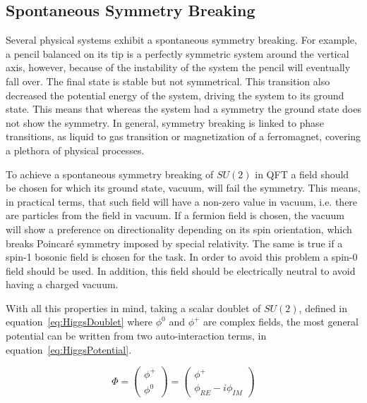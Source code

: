 \subsection{Spontaneous Symmetry Breaking}
\label{sec:SSB}

Several physical systems exhibit a spontaneous symmetry breaking. For example, a pencil balanced on its tip is a perfectly symmetric system around the vertical axis, however, because of the instability of the system the pencil will eventually fall over. The final state is stable but not symmetrical. This transition also decreased the potential energy of the system, driving the system to its ground state. This means that whereas the system had a symmetry the ground state does not show the symmetry. In general, symmetry breaking is linked to phase transitions, as liquid to gas transition or magnetization of a ferromagnet, covering a plethora of physical processes. %

To achieve a spontaneous symmetry breaking of $SU(2)$ in QFT a field should be chosen for which its ground state, vacuum, will fail the symmetry. This means, in practical terms, that such field will have a non-zero value in vacuum, i.e. there are particles from the field in vacuum. If a fermion field is chosen, the vacuum will show a preference on directionality depending on its spin orientation, which breaks Poincar\'{e} symmetry imposed by special relativity. The same is true if a spin-1 bosonic field is chosen for the task. In order to avoid this problem a spin-0 field should be used. In addition, this field should be electrically neutral to avoid having a charged vacuum.

With all this properties in mind, taking a scalar doublet of $SU(2)$, defined in equation~\ref{eq:HiggsDoublet} where $\phi^{0}$ and $\phi^{+}$ are complex fields, the most general potential can be written from two auto-interaction terms, in equation~\ref{eq:HiggsPotential}.

\begin{equation}
  \label{eq:HiggsDoublet}
  \Phi=\left(
    \begin{array}{c}
      \phi^{+} \\
      \phi^{0}
    \end{array}
  \right)=\left(
    \begin{array}{c}
      \phi^{+} \\
      \phi_{RE}-i\phi_{IM}
    \end{array}
  \right)
\end{equation}

